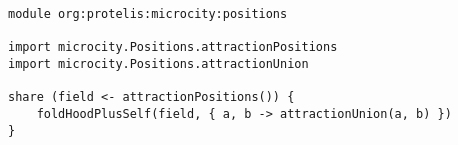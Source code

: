 \begin{lstlisting}[label={lst:protelis-positions}, caption=Sharing the coordinates of each attraction to all the nodes that implement this behaviour.]
module org:protelis:microcity:positions

import microcity.Positions.attractionPositions
import microcity.Positions.attractionUnion

share (field <- attractionPositions()) {
    foldHoodPlusSelf(field, { a, b -> attractionUnion(a, b) })
}
\end{lstlisting}
